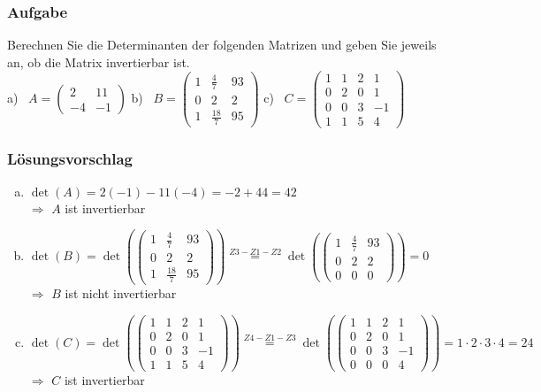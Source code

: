 \documentclass[a4paper,11pt]{scrartcl}
\newcounter{auf}
\newcommand{\Aufgabe}%
        {\addtocounter{auf}{1} \subsubsection*{\rmfamily  Aufgabe \theauf \hspace{1em}} }
\begin{document}
\newpage
\Aufgabe
Berechnen Sie die Determinanten der folgenden Matrizen und geben Sie jeweils an, ob die Matrix invertierbar ist.\\
%
\hspace*{10mm} a) \ $A=\begin{pmatrix} 2 & 11 \\ -4 & -1 \end{pmatrix}$ \qquad
b) \ $B=\begin{pmatrix} 1 & \frac{4}{7} & 93 \\ 0 & 2 & 2 \\1 & \frac{18}{7} & 95 \end{pmatrix}$ \qquad
c) \ $C=\begin{pmatrix} 1 & 1 &  2 & 1 \\ 0 & 2 & 0 & 1 \\ 0 & 0& 3 & -1 \\ 1 & 1 & 5 & 4 \end{pmatrix}$
%
%
\subsubsection*{Lösungsvorschlag}
\begin{enumerate}[a)]
\item $\det(A)=2(-1)-11(-4)=-2+44=42$ \\
$\Rightarrow$ $A$ ist invertierbar
\item $\det(B)=\det(\begin{pmatrix} 1 & \frac{4}{7} & 93 \\ 0 & 2 & 2 \\1 & \frac{18}{7} & 95 \end{pmatrix})\stackrel{Z3-Z1-Z2}{=}\det(\begin{pmatrix} 1 & \frac{4}{7} & 93 \\ 0 & 2 & 2 \\0&0&0 \end{pmatrix})=0$ \\
$\Rightarrow$ $B$ ist nicht invertierbar
\item $\det(C)=\det(\begin{pmatrix} 1 & 1 &  2 & 1 \\ 0 & 2 & 0 & 1 \\ 0 & 0& 3 & -1 \\ 1 & 1 & 5 & 4 \end{pmatrix})\stackrel{Z4-Z1-Z3}{=}\det(\begin{pmatrix} 1 & 1 &  2 & 1 \\ 0 & 2 & 0 & 1 \\ 0 & 0& 3 & -1 \\ 0 & 0 & 0 & 4 \end{pmatrix})=1\cdot2\cdot3\cdot4=24$ \\
$\Rightarrow$ $C$ ist invertierbar
\end{enumerate}
\end{document}
